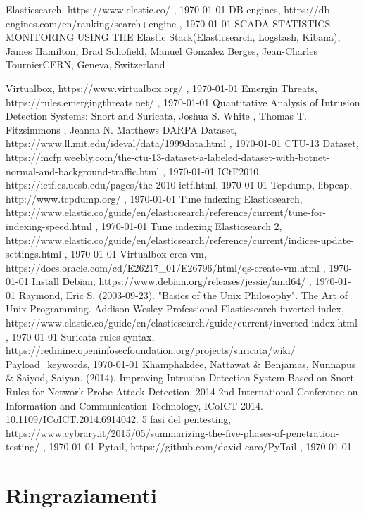\documentclass[12pt,a4paper,openright,twoside]{report}
\begin{document}
\begin{thebibliography}{90}
 Elasticsearch, https://www.elastic.co/ , \today
{} DB-engines, https://db-engines.com/en/ranking/search+engine , \today
{} SCADA STATISTICS MONITORING USING THE Elastic Stack(Elasticsearch, Logstash, Kibana), James Hamilton, Brad Schofield, Manuel Gonzalez Berges, Jean-Charles TournierCERN, Geneva, Switzerland

 Virtualbox, https://www.virtualbox.org/ , \today
{} Emergin Threats, https://rules.emergingthreats.net/ , \today
{} Quantitative Analysis of Intrusion Detection Systems: Snort and Suricata, Joshua S. White , Thomas T. Fitzsimmons , Jeanna N. Matthews
 DARPA Dataset, https://www.ll.mit.edu/ideval/data/1999data.html , \today
{} CTU-13 Dataset, https://mcfp.weebly.com/the-ctu-13-dataset-a-labeled-dataset-with-botnet-normal-and-background-traffic.html , \today
{} ICtF2010, https://ictf.cs.ucsb.edu/pages/the-2010-ictf.html, \today
{} Tcpdump, libpcap, http://www.tcpdump.org/ , \today
{} Tune indexing Elasticsearch, \\ https://www.elastic.co/guide/en/elasticsearch/reference/current/tune-for-indexing-speed.html , \today
{} Tune indexing Elasticsearch 2, \\ https://www.elastic.co/guide/en/elasticsearch/reference/current/indices-update-settings.html , \today
{} Virtualbox crea vm, \\ https://docs.oracle.com/cd/E26217\_01/E26796/html/qs-create-vm.html , \today
{} Install Debian, https://www.debian.org/releases/jessie/amd64/ ,  \today
{} Raymond, Eric S. (2003-09-23). "Basics of the Unix Philosophy". The Art of Unix Programming. Addison-Wesley Professional
 Elasticsearch inverted index, \\ https://www.elastic.co/guide/en/elasticsearch/guide/current/inverted-index.html , \today
{} Suricata rules syntax, \\ https://redmine.openinfosecfoundation.org/projects/suricata/wiki/\\Payload\_keywords, \today
{} Khamphakdee, Nattawat & Benjamas, Nunnapus & Saiyod, Saiyan. (2014). Improving Intrusion Detection System Based on Snort Rules for Network Probe Attack Detection. 2014 2nd International Conference on Information and Communication Technology, ICoICT 2014. 10.1109/ICoICT.2014.6914042.
 5 fasi del pentesting, https://www.cybrary.it/2015/05/summarizing-the-five-phases-of-penetration-testing/ , \today
{} Pytail, https://github.com/david-caro/PyTail , \today
\end{thebibliography}
\clearpage{\pagestyle{empty}\cleardoublepage}
\chapter*{Ringraziamenti}
\thispagestyle{empty}
\end{document}
